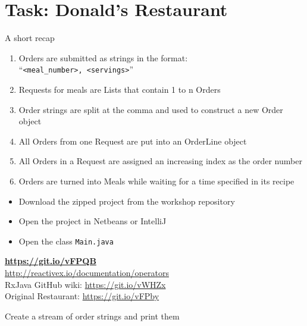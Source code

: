 \section{Task: Donald's Restaurant}\label{sec:donald}

\begin{frame}
	\centering
    \LARGE
    {}
\end{frame}

\begin{frame}{A short recap}
    \begin{enumerate}
        \item Orders are submitted as strings in the format: \\
        \enquote{\texttt{<meal\_number>, <servings>}}
        \item Requests for meals are Lists that contain 1 to n Orders
        \item Order strings are split at the comma and used to construct a new Order object
        \item All Orders from one Request are put into an OrderLine object
        \item All Orders in a Request are assigned an increasing index as the order number
        \item Orders are turned into Meals while waiting for a time specified in its recipe
    \end{enumerate}
\end{frame}

\begin{frame}{{}}
	\begin{itemize}
		\item Download the zipped project from the workshop repository
        \item Open the project in Netbeans or IntelliJ
        \item Open the class \texttt{Main.java}
	\end{itemize}
    \medskip
    \centering
    \LARGE
    \textbf{\url{https://git.io/vFPQB}}\\
    \normalsize
    \bigskip
    \url{http://reactivex.io/documentation/operators}\\
    RxJava GitHub wiki: \url{https://git.io/vWHZx}\\
    Original Restaurant: \url{https://git.io/vFPby}
\end{frame}

\begin{frame}{{}}
    \centering
    \Large
    Create a stream of order strings and print them
\end{frame}


